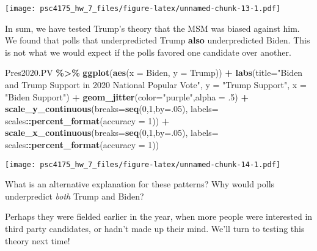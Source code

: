 \documentclass[
]{article}
\newenvironment{Shaded}{\begin{snugshade}}{\end{snugshade}}
\newcommand{\AttributeTok}[1]{\textcolor[rgb]{0.13,0.29,0.53}{#1}}
\newcommand{\DecValTok}[1]{\textcolor[rgb]{0.00,0.00,0.81}{#1}}
\newcommand{\FunctionTok}[1]{\textcolor[rgb]{0.13,0.29,0.53}{\textbf{#1}}}
\newcommand{\NormalTok}[1]{#1}
\newcommand{\SpecialCharTok}[1]{\textcolor[rgb]{0.81,0.36,0.00}{\textbf{#1}}}
\newcommand{\StringTok}[1]{\textcolor[rgb]{0.31,0.60,0.02}{#1}}
\begin{document}
\texttt{[image: psc4175\_hw\_7\_files/figure-latex/unnamed-chunk-13-1.pdf]}

In sum, we have tested Trump's theory that the MSM was biased against
him. We found that polls that underpredicted Trump \textbf{also}
underpredicted Biden. This is not what we would expect if the polls
favored one candidate over another.

\begin{Shaded}
\begin{Highlighting}[]
\NormalTok{Pres2020.PV }\SpecialCharTok{\%\textgreater{}\%}
  \FunctionTok{ggplot}\NormalTok{(}\FunctionTok{aes}\NormalTok{(}\AttributeTok{x =}\NormalTok{ Biden, }\AttributeTok{y =}\NormalTok{ Trump)) }\SpecialCharTok{+} 
  \FunctionTok{labs}\NormalTok{(}\AttributeTok{title=}\StringTok{"Biden and Trump Support in 2020 National Popular Vote"}\NormalTok{,}
       \AttributeTok{y =} \StringTok{"Trump Support"}\NormalTok{,}
       \AttributeTok{x =} \StringTok{"Biden Support"}\NormalTok{) }\SpecialCharTok{+} 
  \FunctionTok{geom\_jitter}\NormalTok{(}\AttributeTok{color=}\StringTok{"purple"}\NormalTok{,}\AttributeTok{alpha =}\NormalTok{ .}\DecValTok{5}\NormalTok{) }\SpecialCharTok{+} 
    \FunctionTok{scale\_y\_continuous}\NormalTok{(}\AttributeTok{breaks=}\FunctionTok{seq}\NormalTok{(}\DecValTok{0}\NormalTok{,}\DecValTok{1}\NormalTok{,}\AttributeTok{by=}\NormalTok{.}\DecValTok{05}\NormalTok{),}
                     \AttributeTok{labels=}\NormalTok{ scales}\SpecialCharTok{::}\FunctionTok{percent\_format}\NormalTok{(}\AttributeTok{accuracy =} \DecValTok{1}\NormalTok{)) }\SpecialCharTok{+}
  \FunctionTok{scale\_x\_continuous}\NormalTok{(}\AttributeTok{breaks=}\FunctionTok{seq}\NormalTok{(}\DecValTok{0}\NormalTok{,}\DecValTok{1}\NormalTok{,}\AttributeTok{by=}\NormalTok{.}\DecValTok{05}\NormalTok{),}
                     \AttributeTok{labels=}\NormalTok{ scales}\SpecialCharTok{::}\FunctionTok{percent\_format}\NormalTok{(}\AttributeTok{accuracy =} \DecValTok{1}\NormalTok{)) }
\end{Highlighting}
\end{Shaded}

\texttt{[image: psc4175\_hw\_7\_files/figure-latex/unnamed-chunk-14-1.pdf]}

What is an alternative explanation for these patterns? Why would polls
underpredict \emph{both} Trump and Biden?

Perhaps they were fielded earlier in the year, when more people were
interested in third party candidates, or hadn't made up their mind.
We'll turn to testing this theory next time!
\end{document}
